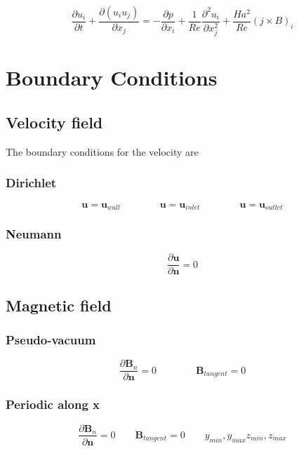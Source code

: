 \documentclass[11pt]{article}
\begin{document}
\begin{equation}
	\frac{\partial u_i}{\partial t} +
	\frac{\partial (u_i u_j)}{\partial x_j}
	=
	- \frac{\partial p}{\partial x_i}
	+ \frac{1}{Re}
	\frac{\partial^2 u_i}{\partial x_j^2}
	+ \frac{Ha^2}{Re}
	(j \times B)_i
\end{equation}



\section{Boundary Conditions}

\subsection{Velocity field}
The boundary conditions for the velocity are

\subsubsection{Dirichlet}

\begin{equation}
	\pmb{u} = \pmb{u}_{wall}
	\qquad \qquad
	\pmb{u} = \pmb{u}_{inlet}
	\qquad \qquad
	\pmb{u} = \pmb{u}_{outlet}
\end{equation}

\subsubsection{Neumann}
\begin{equation}
	\frac{\partial \pmb{u}}{\partial \pmb{n}} = 0
\end{equation}

\subsection{Magnetic field}
\subsubsection{Pseudo-vacuum}
\begin{equation}
	\frac{\partial \pmb{B}_{n}}{\partial \pmb{n}} = 0
	\qquad \qquad
	\pmb{B}_{tangent} = 0
\end{equation}

\subsubsection{Periodic along x}
\begin{equation}
	\frac{\partial \pmb{B}_{n}}{\partial \pmb{n}} = 0
	\qquad
	\pmb{B}_{tangent} = 0
	\qquad
	y_{min},y_{max}
	z_{min},z_{max}
\end{equation}
\end{document}
